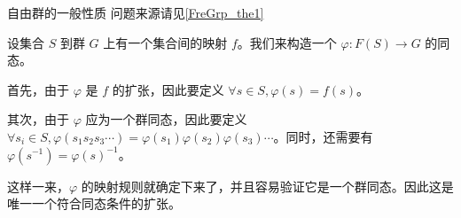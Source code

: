 \begin{example}{自由群的一般性质}\label{GroupP_ex4}
问题来源请见\autoref{FreGrp_the1}~

设集合 $S$ 到群 $G$ 上有一个集合间的映射 $f$。我们来构造一个 $\varphi: F(S)\rightarrow G$ 的同态。

首先，由于 $\varphi$ 是 $f$ 的扩张，因此要定义 $\forall s\in S, \varphi(s)=f(s)$。

其次，由于 $\varphi$ 应为一个群同态，因此要定义 $\forall s_i\in S, \varphi({s_1s_2s_3\cdots})=\varphi(s_1)\varphi(s_2)\varphi(s_3)\cdots$。同时，还需要有 $\varphi(s^{-1})=\varphi(s)^{-1}$。

这样一来，$\varphi$ 的映射规则就确定下来了，并且容易验证它是一个群同态。因此这是唯一一个符合同态条件的扩张。


\end{example}

